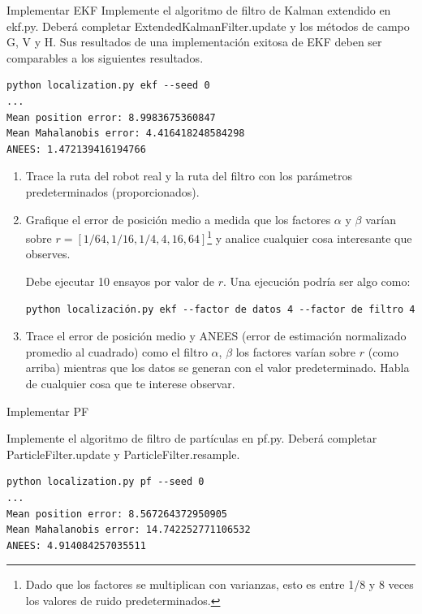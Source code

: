 \documentclass[tp]{lcc}
\begin{document}
\ejercicio Implementar EKF
Implemente el algoritmo de filtro de Kalman extendido en ekf.py. Deberá completar ExtendedKalmanFilter.update
y los métodos de campo G, V y H. Sus resultados de una implementación exitosa de EKF deben ser comparables
a los siguientes resultados.

\begin{lstlisting}[style=bash] 
python localization.py ekf --seed 0
...
Mean position error: 8.9983675360847
Mean Mahalanobis error: 4.416418248584298
ANEES: 1.472139416194766
\end{lstlisting}


\begin{enumerate}
	\item Trace la ruta del robot real y la ruta del filtro con los parámetros predeterminados (proporcionados).
	\item  Grafique el error de posición medio a medida que los factores $\alpha$ y $\beta$ varían sobre $r = [1/64, 1/16, 1/4, 4, 16, 64]$\footnote{Dado que los factores se multiplican con varianzas, esto es entre 1/8 y 8 veces los valores de ruido predeterminados.} y analice cualquier cosa interesante que observes.
	
	Debe ejecutar 10 ensayos por valor de $r$. Una ejecución podría ser algo como:

\begin{lstlisting}[style=bash] 
python localización.py ekf --factor de datos 4 --factor de filtro 4
\end{lstlisting}

	\item Trace el error de posición medio y ANEES (error de estimación normalizado promedio al cuadrado) como el filtro $\alpha$, $\beta$ los factores varían sobre $r$ (como arriba) mientras que los datos se generan con el valor predeterminado. Habla de cualquier cosa que te interese observar.
\end{enumerate}


\ejercicio Implementar PF

Implemente el algoritmo de filtro de partículas en pf.py. Deberá completar ParticleFilter.update y ParticleFilter.resample.

\begin{lstlisting}[style=bash] 
python localization.py pf --seed 0
...
Mean position error: 8.567264372950905
Mean Mahalanobis error: 14.742252771106532
ANEES: 4.914084257035511
\end{lstlisting}
\end{document}
